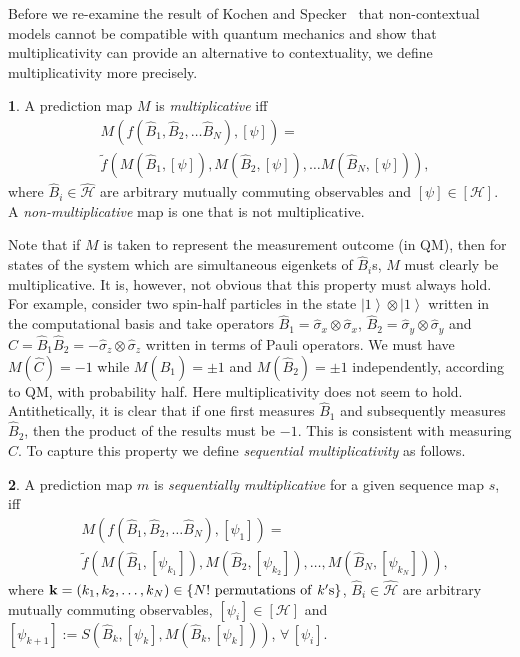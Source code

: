 \documentclass[british,aps,prl,superscriptaddress,nofootinbib,times,reprint]{revtex4-1}
\theoremstyle{plain}
\theoremstyle{plain}
\theoremstyle{definition}
\newtheorem{defn}{\protect\definitionname}
\theoremstyle{remark}
\theoremstyle{remark}
\theoremstyle{remark}
\theoremstyle{plain}
\theoremstyle{plain}
\theoremstyle{plain}
\theoremstyle{definition}
\theoremstyle{definition}
\providecommand{\definitionname}{Definition}
\begin{document}
Before we re-examine the result of Kochen and
Specker~\cite{KochenSpecker} that non-contextual
models cannot be compatible with quantum
mechanics and show that multiplicativity can provide an
alternative to contextuality, we define
multiplicativity more precisely.
\begin{defn}
A prediction map $M$ is \emph{multiplicative} iff
\begin{align*} &
M(f(\hat{B}_{1},\hat{B}_{2},\dots\hat{B}_{N}),[\psi])
= \\ & \tilde
f(M(\hat{B}_{1},[\psi]),M(\hat{B}_{2},[\psi]),\dots
M(\hat{B}_{N},[\psi])), \end{align*}
where $\hat{B}_{i}\in\hat{\mathcal{H}}$ are
arbitrary mutually commuting observables and
$[\psi]\in[\mathcal{H}]$. A
\emph{non-multiplicative} map is one that is not
multiplicative.  
\end{defn} 
Note that if $M$ is taken to represent the
measurement outcome (in QM), then for states of
the system which are simultaneous eigenkets of
$\hat{B}_{i}$s, $M$ must clearly be
multiplicative. It is, however, not obvious that
this property must always hold. For example,
consider two spin-half particles in the state 
$\left|1\right\rangle \otimes\left|1\right\rangle
$ written in the computational basis and take
operators 
$\hat{B}_{1}=\hat{\sigma}_{x}\otimes\hat{\sigma}_{x}$,
$\hat{B}_{2}=\hat{\sigma}_{y}\otimes\hat{\sigma}_{y}$
and
$\hat{C}=\hat{B}_{1}\hat{B}_{2}=-\hat{\sigma}_{z}\otimes\hat{\sigma}_{z}$
written in terms of Pauli operators.
We must have $M(\hat{C})=-1$ while
$M(\hat{B}_{1})=\pm1$ and $M(\hat{B}_{2})=\pm1$
independently, according to QM, with probability
half. Here multiplicativity does not seem to hold.
Antithetically, it is clear that if one first
measures $\hat{B}_{1}$ and subsequently measures
$\hat{B}_{2}$, then the product of the results
must be $-1$. This is consistent with measuring
$\hat{C}$. To capture this property we define
\emph{sequential multiplicativity} as follows.
\begin{defn} 
A prediction map $m$ is
\emph{sequentially multiplicative} for a given
sequence map $s$, iff \begin{align*}
&M(f(\hat{B}_{1},\hat{B}_{2},\dots\hat{B}_{N}),[\psi_{1}])=\\
&\tilde
f(M(\hat{B}_{1},[\psi_{k_{1}}]),M(\hat{B}_{2},[\psi_{k_{2}}]),\dots,M(\hat{B}_{N},[\psi_{k_{N}}])),
\end{align*} 
where
$\mathbf{k}=(k_{1},k_{2},\dots,k_{N})\in\{
N! {\rm ~permutations~of~}  k'{\rm s}
\}$, $\hat{B}_{i}\in\hat{\mathcal{H}}$ are
arbitrary mutually commuting observables,
$[\psi_{i}]\in[\mathcal{H}]$ and
$[\psi_{k+1}] :=
S(\hat{B}_{k},[\psi_{k}],M(\hat{B}_{k},[\psi_{k}]))$,
$\forall\,[\psi_{i}]$.  
\label{defn:seqnMltpl}\end{defn} 
\end{document}
